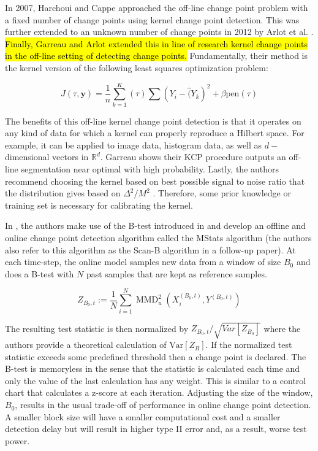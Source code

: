 In 2007, Harchoui and Cappe \cite{harchaoui2007retrospective} approached the off-line change point problem with a fixed number of change points using kernel change point detection. This was further extended to an unknown number of change points in 2012 by Arlot et al. \cite{arlot2012kernel}. \hl{Finally, Garreau and Arlot extended this in line of research kernel change points in the off-line setting of detecting change points.} Fundamentally, their method is the kernel version of the following least squares optimization problem:

\begin{equation}
J(\tau, \mathbf{y}) = \frac{1}{n} \sum_{k=1}^K(\tau) \sum (Y_i - \hat(Y_k)^2 + \beta \text{pen}(\tau)
\end{equation}


The benefits of this off-line kernel change point detection is that it operates on any kind of data for which a kernel can properly reproduce a Hilbert space. For example, it can be applied to image data, histogram data, as well as $d-$dimensional vectors in $\mathbb{R}^d$. Garreau shows their KCP procedure outputs an off-line segmentation near optimal with high probability. Lastly, the authors recommend choosing the kernel based on best possible signal to noise ratio that the distribution gives based on $ \Delta^2 / M^2$ . Therefore, some prior knowledge or training set is necessary for calibrating the kernel. 

In  \cite{li2015m}, the authors make use of the B-test introduced in \cite{zaremba2013b} and develop an offline and online change point detection algorithm called the MStats algorithm (the authors also refer to this algorithm as the Scan-B algorithm in a follow-up paper). At each time-step, the online model samples new data from a window of size $B_0$ and does a B-test with $N$ past samples that are kept as reference samples. 

$$Z_{B_{0}, t}:=\frac{1}{N} \sum_{i=1}^{N} \operatorname{MMD}_{u}^{2}\left(X_{i}^{\left(B_{0}, t\right)}, Y^{\left(B_{0}, t\right)}\right)$$

The resulting test statistic is then normalized by $Z_{B_{0}, t}/\sqrt{Var[Z_{B_0}]}$ where the authors provide a theoretical calculation of $\text{Var}[Z_B]$. If the normalized test statistic exceeds some predefined threshold then a change point is declared. The B-test is memoryless in the sense that the statistic is calculated each time and only the value of the last calculation has any weight. This is similar to a control chart that calculates a z-score at each iteration. Adjusting the size of the window, $B_0$, results in the usual trade-off of performance in online change point detection. A smaller block size will have a smaller computational cost and a smaller detection delay but will result in higher type II error and, as a result, worse test power.

